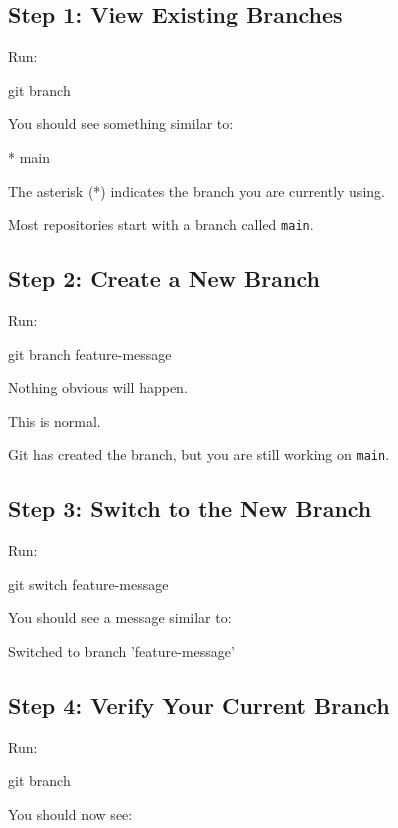 \documentclass{csc2059practical}
\begin{document}
\subsection{Step 1: View Existing Branches}
Run:

\begin{terminalplain}
git branch
\end{terminalplain}
You should see something similar to:

\begin{terminalplain}
  
  * main
\end{terminalplain}


The asterisk (*) indicates the branch you are currently using.

Most repositories start with a branch called \texttt{main}.

\subsection{Step 2: Create a New Branch}
Run:

\begin{terminalplain}
git branch feature-message
\end{terminalplain}
Nothing obvious will happen.

This is normal.

Git has created the branch, but you are still working on \texttt{main}.

\subsection{Step 3: Switch to the New Branch}
Run:

\begin{terminalplain}
git switch feature-message
\end{terminalplain}
You should see a message similar to:

\begin{terminalplain}
Switched to branch 'feature-message'
\end{terminalplain}
\subsection{Step 4: Verify Your Current Branch}
Run:

\begin{terminalplain}
git branch
\end{terminalplain}
You should now see:
\end{document}
